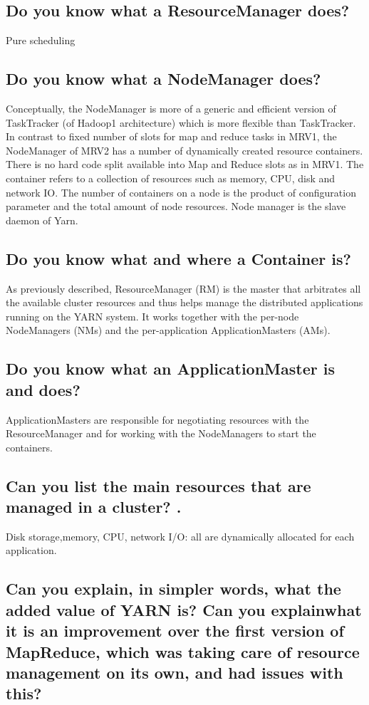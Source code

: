 \documentclass{article}
\begin{document}
\subsection{Do you know what a ResourceManager does?}
Pure scheduling
\subsection{Do you know what a NodeManager does?}
Conceptually, the NodeManager is more of a generic and efficient version of TaskTracker (of Hadoop1 architecture) which is more flexible than TaskTracker. In contrast to fixed number of slots for map and reduce tasks in MRV1, the NodeManager of MRV2 has a number of dynamically created resource containers. There is no hard code split available into Map and Reduce slots as in MRV1. The container refers to a collection of resources such as memory, CPU, disk and network IO. The number of containers on a node is the product of configuration parameter and the total amount of node resources. Node manager is the slave daemon of Yarn.

\subsection{Do you know what and where a Container is?}
As previously described, ResourceManager (RM) is the master that arbitrates all the available cluster resources and thus helps manage the distributed applications running on the YARN system. It works together with the per-node NodeManagers (NMs) and the per-application ApplicationMasters (AMs).

\subsection{Do you know what an ApplicationMaster is and does?}
ApplicationMasters are responsible for negotiating resources with the ResourceManager and for working with the NodeManagers to start the containers.

\subsection{Can you list the main resources that are managed in a cluster? .}
Disk storage,memory, CPU, network I/O: all are dynamically allocated for each application.

\subsection{Can you explain, in simpler words, what the added value of YARN is? Can you explainwhat it is an improvement over the first version of MapReduce, which was taking care of resource management on its own, and had issues with this?}
\end{document}
